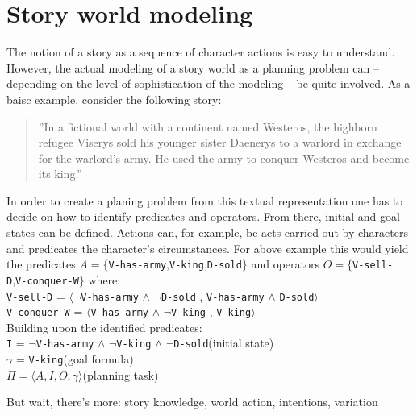 \section{Story world modeling}\label{modeling}
The notion of a story as a sequence of character actions is easy to understand. However, the actual modeling of a story world as a planning problem can -- depending on the level of sophistication of the modeling -- be quite involved. As a baisc example, consider the following story:
\begin{quote}
''In a fictional world with a continent named Westeros, the highborn refugee Viserys sold his younger sister Daenerys to a warlord in exchange for the warlord's army. He used the army to conquer Westeros and become its king.''
\end{quote}
In order to create a planing problem from this textual representation one has to decide on how to identify predicates and operators. From there, initial and goal states can be defined. Actions can, for example, be acts carried out by characters and predicates the character's circumstances. For above example this would yield the predicates $A=\{$\texttt{V-has-army},\texttt{V-king},\texttt{D-sold}$\}$ and operators $O=\{$\texttt{V-sell-D},\texttt{V-conquer-W}$\}$ where:\\
\texttt{V-sell-D} = $\langle\neg$\texttt{V-has-army} $\land$ $\neg$\texttt{D-sold} ,  \texttt{V-has-army} $\land$ \texttt{D-sold}$\rangle$\\
\texttt{V-conquer-W} = $\langle$\texttt{V-has-army} $\land$ $\neg$\texttt{V-king} ,  \texttt{V-king}$\rangle$\\
Building upon the identified predicates:\\
\texttt{I} = $\neg$\texttt{V-has-army} $\land$ $\neg$\texttt{V-king} $\land$ $\neg$\texttt{D-sold}\hphantom{tabtab}(initial state)\\
\texttt{$\gamma$} = \texttt{V-king}\hphantom{tabtabtabtabtabtabtabtabtabtabtab}(goal formula)\\
$\Pi=\langle A,I,O,\gamma\rangle$\hphantom{tabtabtabtabtabtabtabtabtabtal}(planning task)

But wait, there's more: story knowledge, world action, intentions, variation
%
%

